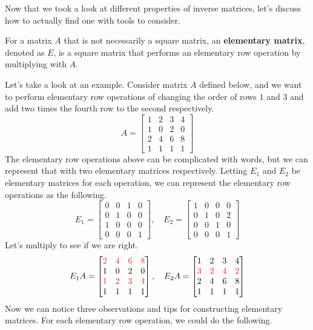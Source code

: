 \documentclass[../main.tex]{subfiles}
\begin{document}
Now that we took a look at different properties of inverse matrices,
let's discuss how to actually find one with tools to consider.

\begin{definition}{}{}
For a matrix $A$ that is not necessarily a square matrix, an
\textbf{elementary matrix}, denoted as $E$, is a square matrix that
performs an elementary row operation by multiplying with $A$.
\end{definition}

Let's take a look at an example. Consider matrix $A$ defined below,
and we want to perform elementary row operations of changing the
order of rows $1$ and $3$ and add two times the fourth row to the
second respectively.
\[
A =
\begin{bmatrix}
    1 & 2 & 3 & 4 \\
    1 & 0 & 2 & 0 \\
    2 & 4 & 6 & 8 \\
    1 & 1 & 1 & 1
\end{bmatrix}
\]
The elementary row operations above can be complicated with words,
but we can represent that with two elementary matrices respectively.
Letting $E_1$ and $E_2$ be elementary matrices for each operation,
we can represent the elementary row operations as the following.
\[
E_1 =
\begin{bmatrix}
    0 & 0 & 1 & 0 \\
    0 & 1 & 0 & 0 \\
    1 & 0 & 0 & 0 \\
    0 & 0 & 0 & 1
\end{bmatrix},
\quad
E_2 =
\begin{bmatrix}
    1 & 0 & 0 & 0 \\
    0 & 1 & 0 & 2 \\
    0 & 0 & 1 & 0 \\
    0 & 0 & 0 & 1
\end{bmatrix}
\]
Let's multiply to see if we are right.
\[
E_1 A =
\begin{bmatrix}
    \textcolor{Red}{2} &
    \textcolor{Red}{4} &
    \textcolor{Red}{6} &
    \textcolor{Red}{8} \\
    1 & 0 & 2 & 0 \\
    \textcolor{Red}{1} &
    \textcolor{Red}{2} &
    \textcolor{Red}{3} &
    \textcolor{Red}{4} \\
    1 & 1 & 1 & 1
\end{bmatrix},
\quad
E_2 A =
\begin{bmatrix}
    1 & 2 & 3 & 4 \\
    \textcolor{Red}{3} &
    \textcolor{Red}{2} &
    \textcolor{Red}{4} &
    \textcolor{Red}{2} \\
    2 & 4 & 6 & 8 \\
    1 & 1 & 1 & 1
\end{bmatrix}
\]
Now we can notice three observations and tips for constructing
elementary matrices. For each elementary row operation, we could
do the following.
\end{document}

